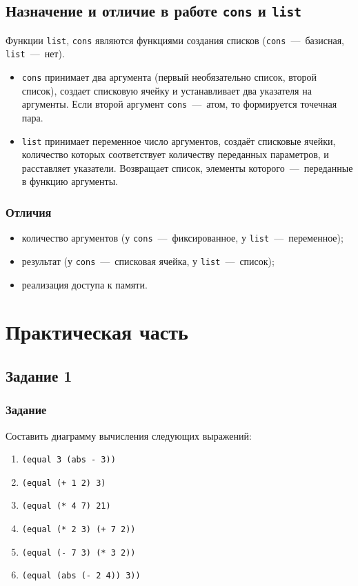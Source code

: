 \section{Назначение и отличие в работе \texttt{cons} и \texttt{list}}
Функции \texttt{list}, \texttt{cons} являются функциями создания списков (\texttt{cons}~---~базисная, \texttt{list}~---~нет). 

\begin{itemize}
	\item \texttt{cons} принимает два аргумента (первый необязательно список, второй список), создает списковую ячейку и устанавливает два указателя на аргументы. Если второй аргумент \texttt{cons}~---~атом, то формируется точечная пара.
	\item \texttt{list} принимает переменное число аргументов, создаёт списковые ячейки, количество которых соответствует количеству переданных параметров, и расставляет указатели. Возвращает список, элементы которого~---~переданные в функцию аргументы.
\end{itemize}

\subsection*{Отличия}
\begin{itemize}
	\item количество аргументов (у \texttt{cons}~---~фиксированное, у \texttt{list}~---~переменное);
	\item результат (у \texttt{cons}~---~списковая ячейка, у \texttt{list}~---~список);
	\item реализация доступа к памяти.
\end{itemize}

\newpage

\chapter{Практическая часть}
\section{Задание 1}
\subsection*{Задание}
Составить диаграмму вычисления следующих выражений:

\begin{enumerate}
	\item \texttt{(equal 3 (abs - 3))}
	\item \texttt{(equal (+ 1 2) 3)}
	\item \texttt{(equal (* 4 7) 21)}
	\item \texttt{(equal (* 2 3) (+ 7 2))}
	\item \texttt{(equal (- 7 3) (* 3 2))}
	\item \texttt{(equal (abs (- 2 4)) 3))}
\end{enumerate}


